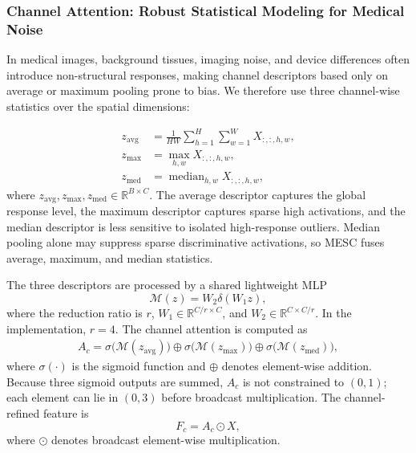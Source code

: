 \documentclass[runningheads]{llncs}
\begin{document}
\subsubsection{Channel Attention: Robust Statistical Modeling for Medical Noise}

In medical images, background tissues, imaging noise, and device differences often introduce non-structural responses, making channel descriptors based only on average or maximum pooling prone to bias. We therefore use three channel-wise statistics over the spatial dimensions:

\begin{equation}
\begin{aligned}
    z_{\text{avg}} &= \frac{1}{HW}\sum_{h=1}^{H}\sum_{w=1}^{W}X_{:,:,h,w},\\
    z_{\text{max}} &= \max_{h,w} X_{:,:,h,w},\\
    z_{\text{med}} &= \operatorname{median}_{h,w} X_{:,:,h,w},
\end{aligned}
\end{equation}
where \(z_{\text{avg}}, z_{\text{max}}, z_{\text{med}} \in \mathbb{R}^{B \times C}\). The average descriptor captures the global response level, the maximum descriptor captures sparse high activations, and the median descriptor is less sensitive to isolated high-response outliers. Median pooling alone may suppress sparse discriminative activations, so MESC fuses average, maximum, and median statistics.

The three descriptors are processed by a shared lightweight MLP
\begin{equation}
    \mathcal{M}(z)=W_2\delta(W_1 z),
\end{equation}
where the reduction ratio is \(r\), \(W_1 \in \mathbb{R}^{C/r \times C}\), and \(W_2 \in \mathbb{R}^{C \times C/r}\). In the implementation, \(r=4\). The channel attention is computed as
\begin{equation}
\begin{aligned}
    A_c = \sigma\big(\mathcal{M}(z_{\text{avg}})\big)
      \oplus \sigma\big(\mathcal{M}(z_{\text{max}})\big)
      \oplus \sigma\big(\mathcal{M}(z_{\text{med}})\big),
\end{aligned}
\end{equation}
where \(\sigma(\cdot)\) is the sigmoid function and \(\oplus\) denotes element-wise addition. Because three sigmoid outputs are summed, \(A_c\) is not constrained to \((0,1)\); each element can lie in \((0,3)\) before broadcast multiplication. The channel-refined feature is
\begin{equation}
    F_c = A_c \odot X,
\end{equation}
where \(\odot\) denotes broadcast element-wise multiplication.
\end{document}
